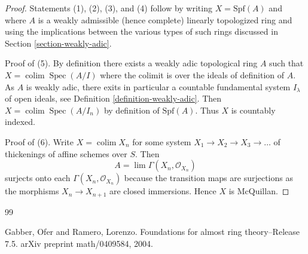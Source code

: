 \documentclass{stacks-project}
\theoremstyle{plain}
\theoremstyle{definition}
\theoremstyle{remark}
\numberwithin{equation}{subsection}
\def\lim{\mathop{\mathrm{lim}}\nolimits}
\def\colim{\mathop{\mathrm{colim}}\nolimits}
\def\Spec{\mathop{\mathrm{Spec}}}
\begin{document}
\begin{proof}
Statements (1), (2), (3), and (4) follow by writing $X = \text{Spf}(A)$
and where $A$ is a weakly admissible (hence complete) linearly
topologized ring and using the implications between the various
types of such rings discussed in Section \ref{section-weakly-adic}.

\medskip\noindent
Proof of (5). By definition there exists a weakly adic topological ring $A$
such that $X = \colim \Spec(A/I)$ where the colimit is over the ideals
of definition of $A$. As $A$ is weakly adic, there exits in particular
a countable fundamental system $I_\lambda$ of open ideals, see
Definition \ref{definition-weakly-adic}.
Then $X = \colim \Spec(A/I_n)$ by definition of $\text{Spf}(A)$.
Thus $X$ is countably indexed.

\medskip\noindent
Proof of (6). Write $X = \colim X_n$ for some system
$X_1 \to X_2 \to X_3 \to \ldots$ of thickenings of affine
schemes over $S$. Then
$$
A = \lim \Gamma(X_n, \mathcal{O}_{X_n})
$$
surjects onto each $\Gamma(X_n, \mathcal{O}_{X_n})$ because the transition
maps are surjections as the morphisms $X_n \to X_{n + 1}$ are closed
immersions. Hence $X$ is McQuillan.
\end{proof}

\begin{thebibliography}{99}

Gabber, Ofer and Ramero, Lorenzo.
\newblock Foundations for almost ring theory--Release 7.5.
\newblock arXiv preprint math/0409584, 2004.

\end{thebibliography}
\end{document}
